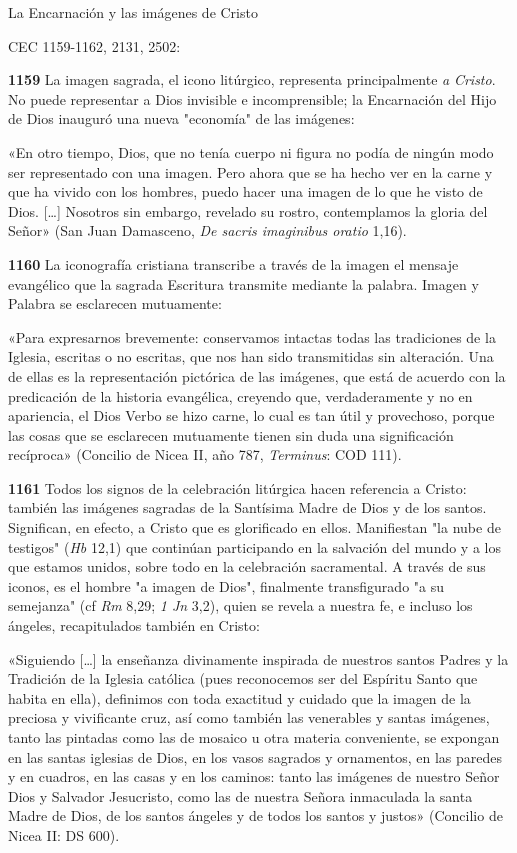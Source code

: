 \documentclass[]{article}
\begin{document}
La Encarnación y las imágenes de Cristo

CEC 1159-1162, 2131, 2502:

\textbf{1159} La imagen sagrada, el icono litúrgico, representa
principalmente \emph{a} \emph{Cristo}. No puede representar a Dios
invisible e incomprensible; la Encarnación del Hijo de Dios inauguró una
nueva "economía" de las imágenes:

«En otro tiempo, Dios, que no tenía cuerpo ni figura no podía de ningún
modo ser representado con una imagen. Pero ahora que se ha hecho ver en
la carne y que ha vivido con los hombres, puedo hacer una imagen de lo
que he visto de Dios. [\ldots{}] Nosotros sin embargo, revelado su
rostro, contemplamos la gloria del Señor» (San Juan Damasceno, \emph{De
sacris imaginibus oratio} 1,16).

\textbf{1160} La iconografía cristiana transcribe a través de la imagen
el mensaje evangélico que la sagrada Escritura transmite mediante la
palabra. Imagen y Palabra se esclarecen mutuamente:

«Para expresarnos brevemente: conservamos intactas todas las tradiciones
de la Iglesia, escritas o no escritas, que nos han sido transmitidas sin
alteración. Una de ellas es la representación pictórica de las imágenes,
que está de acuerdo con la predicación de la historia evangélica,
creyendo que, verdaderamente y no en apariencia, el Dios Verbo se hizo
carne, lo cual es tan útil y provechoso, porque las cosas que se
esclarecen mutuamente tienen sin duda una significación recíproca»
(Concilio de Nicea II, año 787, \emph{Terminus}: COD 111).

\textbf{1161} Todos los signos de la celebración litúrgica hacen
referencia a Cristo: también las imágenes sagradas de la Santísima Madre
de Dios y de los santos. Significan, en efecto, a Cristo que es
glorificado en ellos. Manifiestan "la nube de testigos" (\emph{Hb} 12,1)
que continúan participando en la salvación del mundo y a los que estamos
unidos, sobre todo en la celebración sacramental. A través de sus
iconos, es el hombre "a imagen de Dios", finalmente transfigurado "a su
semejanza" (cf \emph{Rm} 8,29; \emph{1 Jn} 3,2), quien se revela a
nuestra fe, e incluso los ángeles, recapitulados también en Cristo:

«Siguiendo [\ldots{}] la enseñanza divinamente inspirada de nuestros
santos Padres y la Tradición de la Iglesia católica (pues reconocemos
ser del Espíritu Santo que habita en ella), definimos con toda exactitud
y cuidado que la imagen de la preciosa y vivificante cruz, así como
también las venerables y santas imágenes, tanto las pintadas como las de
mosaico u otra materia conveniente, se expongan en las santas iglesias
de Dios, en los vasos sagrados y ornamentos, en las paredes y en
cuadros, en las casas y en los caminos: tanto las imágenes de nuestro
Señor Dios y Salvador Jesucristo, como las de nuestra Señora inmaculada
la santa Madre de Dios, de los santos ángeles y de todos los santos y
justos» (Concilio de Nicea II: DS 600).
\end{document}

